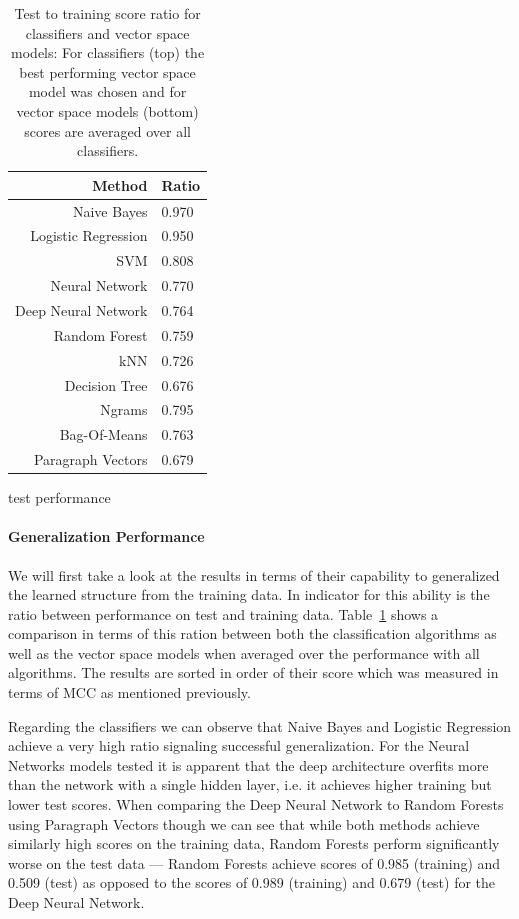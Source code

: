 \clearpage

\begin{table}
\centering
\begin{tabular}{ r l }
  \toprule
  Method & Ratio \\
  \midrule
  Naive Bayes & 0.970 \\
  Logistic Regression & 0.950 \\
  SVM & 0.808 \\
  Neural Network & 0.770 \\
  Deep Neural Network & 0.764 \\
  Random Forest & 0.759 \\
  kNN & 0.726 \\
  Decision Tree & 0.676 \\
  \midrule
  Ngrams & 0.795 \\
  Bag-Of-Means & 0.763 \\
  Paragraph Vectors & 0.679 \\
  \bottomrule
\end{tabular}
\caption{Test to training score ratio for classifiers and vector space models: For classifiers (top) the best performing vector space model was chosen and for vector space models (bottom) scores are averaged over all classifiers.}
\label{tab:Test/Training Ratio}
\end{table}



test performance


\paragraph{Generalization Performance}
\label{par:Generalization Performance}

We will first take a look at the results in terms of their capability to generalized the learned structure from the training data. In indicator for this ability is the ratio between performance on test and training data. Table~\ref{tab:Test/Training Ratio} shows a comparison in terms of this ration between both the classification algorithms as well as the vector space models when averaged over the performance with all algorithms. The results are sorted in order of their score which was measured in terms of \gls{MCC} as mentioned previously.

Regarding the classifiers we can observe that Naive Bayes and Logistic Regression achieve a very high ratio signaling successful generalization.
For the Neural Networks models tested it is apparent that the deep architecture overfits more than the network with a single hidden layer, i.e. it achieves higher training but lower test scores. When comparing the Deep Neural Network to Random Forests using Paragraph Vectors though we can see that while both methods achieve similarly high scores on the training data, Random Forests perform significantly worse on the test data --- Random Forests achieve scores of 0.985 (training) and 0.509 (test) as opposed to the scores of 0.989 (training) and 0.679 (test)  for the Deep Neural Network.


